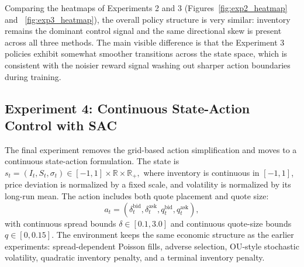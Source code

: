\documentclass[11pt,a4paper]{article}
\begin{document}
Comparing the heatmaps of Experiments 2 and 3 (Figures~\ref{fig:exp2_heatmap} and ~\ref{fig:exp3_heatmap}), the overall policy structure is very similar: inventory remains the dominant control signal and the same directional skew is present across all three methods. The main visible difference is that the Experiment 3 policies exhibit somewhat smoother transitions across the state space, which is consistent with the noisier reward signal washing out sharper action boundaries during training.

\subsection{Experiment 4: Continuous State-Action Control with SAC}

The final experiment removes the grid-based action simplification and moves to a continuous state-action formulation. The state is $s_t = (I_t, S_t, \sigma_t) \in [-1,1] \times \mathbb{R} \times \mathbb{R}_+,$
where inventory is continuous in $[-1,1]$, price deviation is normalized by a fixed scale, and volatility is normalized by its long-run mean. The action includes both quote placement and quote size:
\begin{equation}
    a_t = (\delta_t^{\mathrm{bid}}, \delta_t^{\mathrm{ask}}, q_t^{\mathrm{bid}}, q_t^{\mathrm{ask}}),
\end{equation}
with continuous spread bounds $\delta \in [0.1, 3.0]$ and continuous quote-size bounds $q \in [0, 0.15]$. The environment keeps the same economic structure as the earlier experiments: spread-dependent Poisson fills, adverse selection, OU-style stochastic volatility, quadratic inventory penalty, and a terminal inventory penalty.
\end{document}
